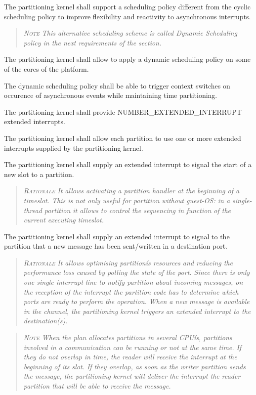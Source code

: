The partitioning kernel shall support a scheduling policy different from the cyclic scheduling policy to improve flexibility and reactivity to asynchronous interrupts.
\begin{quote}\it
\textsc{Note}
This alternative scheduling scheme is called Dynamic Scheduling policy in the next requirements of the section.
\end{quote}

The partitioning kernel shall allow to apply a dynamic scheduling policy on some of the cores of the platform.

The dynamic scheduling policy shall be able to trigger context switches on occurence of asynchronous events while maintaining time partitioning.

The partitioning kernel shall provide NUMBER\_EXTENDED\_INTERRUPT extended interrupts.

The partitioning kernel shall allow each partition to use one or more extended interrupts supplied by the partitioning kernel.

The partitioning kernel shall supply an extended interrupt to signal the start of a new slot to a partition.
\begin{quote}\it
\textsc{Rationale}
It allows activating a partition handler at the beginning of a timeslot. This is not only useful for partition without guest-OS: in a single-thread partition it allows to control the sequencing in function of the current executing timeslot.
\end{quote}

The partitioning kernel shall supply an extended interrupt to signal to the partition that a new message has been sent/written in a destination port.
\begin{quote}\it
\textsc{Rationale}
It allows optimising partitionís resources and reducing the performance loss caused by polling the state of the port. Since there is only one single interrupt line to notify partition about incoming messages, on the reception of the interrupt the partition code has to determine which ports are ready to perform the operation.
When a new message is available in the channel, the partitioning kernel triggers an extended interrupt to the destination(s).
\end{quote}
\begin{quote}\it
\textsc{Note}
When the plan allocates partitions in several CPUís, partitions involved in a communication can be running or not at the same time. If they do not overlap in time, the reader will receive the interrupt at the beginning of its slot. If they overlap, as soon as the writer partition sends the message, the partitioning kernel will deliver the interrupt the reader partition that will be able to receive the message.
\end{quote}

